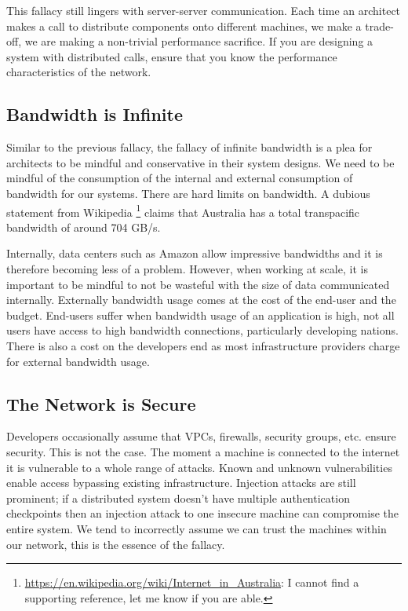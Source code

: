 This fallacy still lingers with server-server communication.
Each time an architect makes a call to distribute components onto different machines,
we make a trade-off,
we are making a non-trivial performance sacrifice.
If you are designing a system with distributed calls,
ensure that you know the performance characteristics of the network.

\subsection{Bandwidth is Infinite}
Similar to the previous fallacy,
the fallacy of infinite bandwidth is a plea for architects to be mindful and conservative in their system designs.
We need to be mindful of the consumption of the internal and external consumption of bandwidth for our systems.
There are hard limits on bandwidth.
A dubious statement from Wikipedia%
\footnote{\url{https://en.wikipedia.org/wiki/Internet_in_Australia}: I cannot find a supporting reference, let me know if you are able.} %
claims that Australia has a total transpacific bandwidth of around 704 GB/s.

Internally, data centers such as Amazon allow impressive bandwidths and it is therefore becoming less of a problem.
However, when working at scale,
it is important to be mindful to not be wasteful with the size of data communicated internally.
Externally bandwidth usage comes at the cost of the end-user and the budget.
End-users suffer when bandwidth usage of an application is high,
not all users have access to high bandwidth connections, particularly developing nations.
There is also a cost on the developers end as most infrastructure providers charge for external bandwidth usage.

\subsection{The Network is Secure}
Developers occasionally assume that VPCs, firewalls, security groups, etc. ensure security.
This is not the case.
The moment a machine is connected to the internet it is vulnerable to a whole range of attacks.
Known and unknown vulnerabilities enable access bypassing existing infrastructure.
Injection attacks are still prominent;
if a distributed system doesn't have multiple authentication checkpoints then an injection attack to one insecure machine can compromise the entire system.
We tend to incorrectly assume we can trust the machines within our network,
this is the essence of the fallacy.

